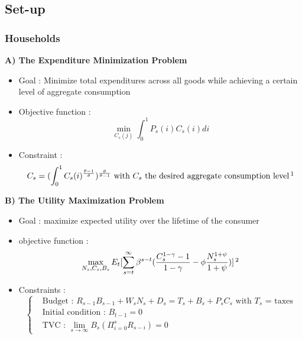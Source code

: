 \documentclass{article}
\begin{document}
\subsection{Set-up}

\subsubsection{Households}

\textbf{A) The Expenditure Minimization Problem}

\begin{itemize}
    \item Goal : Minimize total expenditures across all goods while achieving a certain level of aggregate consumption
    \item Objective function : 
    \begin{equation}
        \min_{C_s(j)}\int_0^1P_s(i)C_s(i)di 
    \end{equation}
    \item Constraint : 
    \begin{equation}
        C_s = (\int_0^1C_s(i)^{\frac{\theta-1}{\theta}})^{\frac{\theta}{\theta-1}} \text{ with $C_s$ the desired aggregate consumption level}\,\footnotemark
    \end{equation}
\end{itemize}

\textbf{B) The Utility Maximization Problem}

\begin{itemize}
    \item Goal : maximize expected utility over the lifetime of the consumer
    \item objective function : 
    \begin{equation}
        \max_{N_s,C_s,B_s}E_t[\sum_{s=t}^\infty\beta^{s-t}(\frac{C_s^{1-\gamma}-1}{1-\gamma}-\phi\frac{N_s^{1+\psi}}{1+\psi})]\,\footnotemark
    \end{equation}
    \item Constraints : 
    \begin{equation}
    \left\{
    \begin{aligned}
        &\text{Budget : } R_{s-1}B_{s-1}+W_sN_s+D_s = T_s + B_s +P_sC_s \text{ with $T_s$ = taxes}\\
        &\text{Initial condition : } B_{t-1} = 0\\
        &\text{TVC : } \lim_{s\to\infty} B_s(\Pi_{i=0}^s R_{s-i}) = 0
    \end{aligned}
    \right.
    \end{equation}
\end{itemize}
\end{document}
